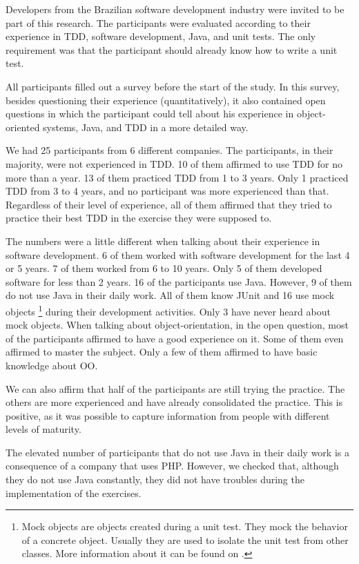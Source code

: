 \documentclass[times]{elsarticle}
\begin{document}
Developers from the Brazilian software development industry were invited to be part
of this research. The participants were evaluated according to their experience in TDD,
software development, Java, and unit tests. The only requirement was that the participant
should already know how to write a unit test.

All participants filled out a survey before the start of the study. In this survey,
besides questioning their experience (quantitatively), it also contained open questions in which
the participant could tell about his experience in object-oriented systems, Java, and
TDD in a more detailed way.

We had 25 participants from 6 different companies. The participants, in their majority,
were not experienced in TDD. 10 of them affirmed to use TDD for no more than a year.
13 of them practiced TDD from 1 to 3 years. Only 1 practiced TDD from 3 to 4
years, and no participant was more experienced than that. Regardless of their level of experience,
all of them affirmed that they tried to practice their best TDD in the exercise they were supposed to.

The numbers were a little different when talking about their experience in software
development. 6 of them worked with software development for the last 4 or 5 years.
7 of them worked from 6 to 10 years. Only 5 of them developed software for less
than 2 years. 16 of the participants use Java. However, 9 of them do not use
Java in their daily work. All of them know JUnit and 16 use mock objects 
\footnote{Mock objects are objects created during a unit test. They mock the behavior 
of a concrete object. Usually they are used to isolate the unit test from other classes. 
More information about it can be found on \cite{mocks}.}
during their development activities.
Only 3 have never heard about mock objects. When talking about object-orientation,
in the open question, most of the participants affirmed to have a good experience
on it. Some of them even affirmed to master the subject. Only a few of them affirmed
to have basic knowledge about OO.

We can also affirm that half of the participants are still trying the practice. The others
are more experienced and have already consolidated the practice. This is positive, as it
was possible to capture information from people with different levels of maturity.

The elevated number of participants that do not use Java in their daily work is a consequence
of a company that uses PHP. However, we checked that, although they do not use Java constantly,
they did not have troubles during the implementation of the exercises.
\end{document}
